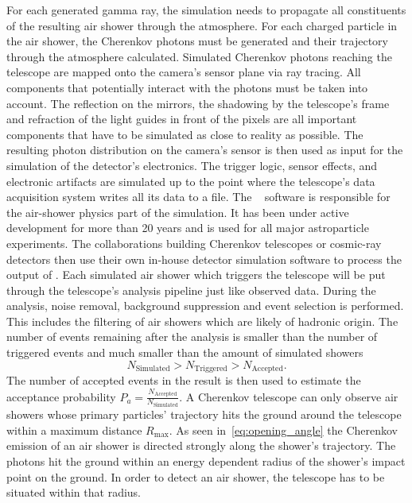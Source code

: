 For each generated gamma ray, the simulation needs to propagate all
constituents of the resulting air shower through the atmosphere.
For each charged particle in the air shower, the Cherenkov photons must be generated and their trajectory through the atmosphere calculated.
Simulated Cherenkov photons reaching the telescope are mapped onto the camera's sensor plane via ray tracing.
All components that potentially interact with the photons must be taken into account. 
The reflection on the mirrors, the shadowing by the telescope's frame and refraction of the light guides in front of the pixels
are all important components that have to be simulated as close to reality as possible. 
The resulting photon distribution on the camera's sensor is then used as input for the 
simulation of the detector's electronics. The trigger logic, sensor effects, and electronic artifacts are simulated 
up to the point where the telescope's data acquisition system writes all its data to a file.
The \corsika~\cite{corsika} software is responsible for the air-shower physics part of the simulation. It has been under active development 
for more than 20 years and is used for all major astroparticle experiments.
The collaborations building Cherenkov telescopes or cosmic-ray detectors then use their own in-house detector simulation software
to process the output of \corsika. 
Each simulated air shower which triggers the telescope will be put through the telescope's analysis pipeline just like observed data. 
During the analysis, noise removal, background suppression and event selection is performed.
This includes the filtering of air showers which are likely of hadronic origin.
The number of events remaining after the analysis is smaller than the number of triggered events and  much smaller than the amount of simulated showers
\begin{equation}
  N_{\text{Simulated}} > N_{\text{Triggered}} > N_{\text{Accepted}}.
\end{equation}
The number of accepted events in the result is then used to estimate the acceptance probability
$P_a = \frac{N_{\text{Accepted}}}{N_{\text{Simulated}}}$.
A Cherenkov telescope can only observe air showers whose primary particles' trajectory hits the ground around the telescope within a 
maximum distance $R_{\mathrm{max}}$. As seen in~\cref{eq:opening_angle} the Cherenkov emission of an air shower is directed strongly along 
the shower's trajectory. The photons hit the ground within an energy dependent radius of the shower's impact point on the ground.
In order to detect an air shower, the telescope has to be situated within that radius. 
